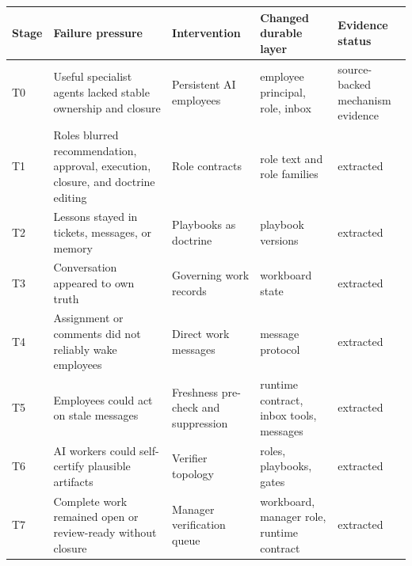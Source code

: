 \documentclass[
]{article}
\newcounter{none} %
\begin{document}
{\def\LTcaptype{none} %
\begin{longtable}[]{@{}
  >{\raggedright\arraybackslash}p{}
  >{\raggedright\arraybackslash}p{}
  >{\raggedright\arraybackslash}p{}
  >{\raggedright\arraybackslash}p{}
  >{\raggedright\arraybackslash}p{}@{}}
\toprule\noalign{}
\begin{minipage}[b]{\linewidth}\raggedright
Stage
\end{minipage} & \begin{minipage}[b]{\linewidth}\raggedright
Failure pressure
\end{minipage} & \begin{minipage}[b]{\linewidth}\raggedright
Intervention
\end{minipage} & \begin{minipage}[b]{\linewidth}\raggedright
Changed durable layer
\end{minipage} & \begin{minipage}[b]{\linewidth}\raggedright
Evidence status
\end{minipage} \\
\midrule\noalign{}
\endhead
\bottomrule\noalign{}
\endlastfoot
T0 & Useful specialist agents lacked stable ownership and closure & Persistent AI employees & employee principal, role, inbox & source-backed mechanism evidence \\
T1 & Roles blurred recommendation, approval, execution, closure, and doctrine editing & Role contracts & role text and role families & extracted \\
T2 & Lessons stayed in tickets, messages, or memory & Playbooks as doctrine & playbook versions & extracted \\
T3 & Conversation appeared to own truth & Governing work records & workboard state & extracted \\
T4 & Assignment or comments did not reliably wake employees & Direct work messages & message protocol & extracted \\
T5 & Employees could act on stale messages & Freshness pre-check and suppression & runtime contract, inbox tools, messages & extracted \\
T6 & AI workers could self-certify plausible artifacts & Verifier topology & roles, playbooks, gates & extracted \\
T7 & Complete work remained open or review-ready without closure & Manager verification queue & workboard, manager role, runtime contract & extracted \\

\end{longtable}}
\end{document}
